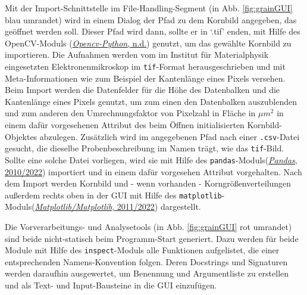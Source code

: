 \documentclass[
  12pt,
  openany]{book}
\begin{document}
Mit der Import-Schnittstelle im File-Handling-Segment (in Abb. \ref{fig:grainGUI} blau umrandet) wird in einem Dialog der Pfad zu dem Kornbild angegeben, das geöffnet werden soll. Dieser Pfad wird dann, sollte er in `.tif' enden, mit Hilfe des OpenCV-Moduls (\protect\hyperlink{ref-OpencvpythonWrapperPackage}{\emph{Opencv-Python}, n.d.}) genutzt, um das gewählte Kornbild zu importieren. Die Aufnahmen werden vom im Institut für Materialphysik eingesetzten Elektronenmikroskop im \texttt{tif}-Format herausgeschrieben und mit Meta-Informationen wie zum Beispiel der Kantenlänge eines Pixels versehen. Beim Import werden die Datenfelder für die Höhe des Datenbalken und die Kantenlänge eines Pixels genutzt, um zum einen den Datenbalken auszublenden und zum anderen den Umrechnungsfaktor von Pixelzahl in Fläche in \(\mu m^2\) in einem dafür vorgesehenen Attribut des beim Öffnen initialisierten Kornbild-Objektes abzulegen. Zusätzlich wird im angegebenen Pfad nach einer \texttt{.csv}-Datei gesucht, die dieselbe Probenbeschreibung im Namen trägt, wie das \texttt{tif}-Bild. Sollte eine solche Datei vorliegen, wird sie mit Hilfe des \texttt{pandas}-Moduls(\protect\hyperlink{ref-PandasPowerfulPython2022}{\emph{Pandas}, 2010/2022}) importiert und in einem dafür vorgesehen Attribut vorgehalten. Nach dem Import werden Kornbild und - wenn vorhanden - Korngrößenverteilungen außerdem rechts oben in der GUI mit Hilfe des \texttt{matplotlib}-Moduls(\protect\hyperlink{ref-MatplotlibMatplotlib2022}{\emph{Matplotlib/Matplotlib}, 2011/2022}) dargestellt.

Die Vorverarbeitungs- und Analysetools (in Abb. \ref{fig:grainGUI} rot umrandet) sind beide nicht-statisch beim Programm-Start generiert. Dazu werden für beide Module mit Hilfe des \texttt{inspect}-Moduls alle Funktionen aufgelistet, die einer entsprechenden Namens-Konvention folgen. Deren Docstrings und Signaturen werden daraufhin ausgewertet, um Benennung und Argumentliste zu erstellen und als Text- und Input-Bausteine in die GUI einzufügen.
\end{document}
